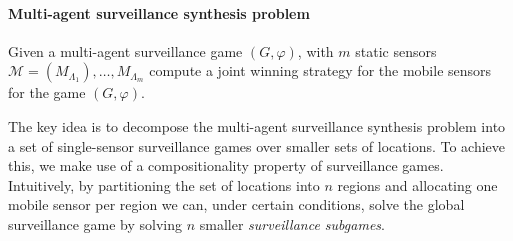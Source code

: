 \paragraph*{\bf Multi-agent surveillance synthesis problem} Given a multi-agent surveillance game $(G,\varphi)$, with $m$ static sensors $\mathcal{M} = (M_{\Lambda_1}),\dots,M_{\Lambda_m}$ compute a joint winning strategy for the mobile sensors for the game $(G,\varphi)$.

The key idea is to decompose the multi-agent surveillance synthesis problem into a set of single-sensor surveillance games over smaller sets of locations. To achieve this, we make use of a compositionality property of surveillance games. Intuitively, by partitioning the set of locations into $n$ regions and allocating one mobile sensor per region we can, under certain conditions, solve the global surveillance game by solving $n$ smaller \emph{surveillance subgames}. 